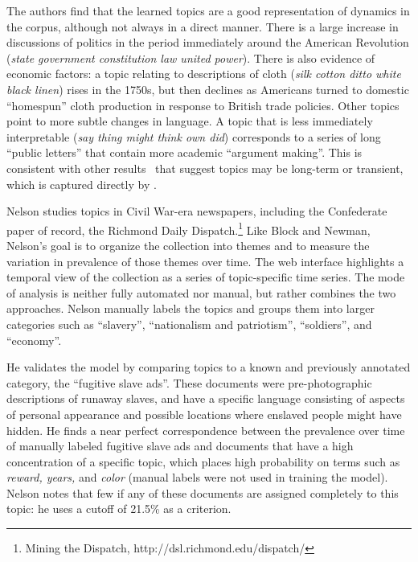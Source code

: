 The authors find that the learned topics are a good representation of dynamics in the corpus, although not always in a direct manner.
There is a large increase in discussions of politics in the period immediately around the American Revolution ({\em state government constitution law united power}).
There is also evidence of economic factors: a topic relating to descriptions of cloth ({\em silk cotton ditto white black linen}) rises in the 1750s, but then declines as Americans turned to domestic ``homespun'' cloth production in response to British trade policies.
Other topics point to more subtle changes in language.
A topic that is less immediately interpretable ({\em  say thing might think own did}) corresponds to a series of long ``public letters'' that contain more academic ``argument making''.  This is consistent with other results~\citep{viermetz-08} that suggest topics may be long-term or transient, which is captured directly by \citet{viermetz-08}.


Nelson studies topics in Civil War-era newspapers, including the Confederate paper of record, the Richmond Daily Dispatch.\footnote{Mining the Dispatch, http://dsl.richmond.edu/dispatch/}
Like Block and Newman, Nelson's goal is to organize the collection into themes and to measure the variation in prevalence of those themes over time.
The web interface highlights a temporal view of the collection as a series of topic-specific time series.
The mode of analysis is neither fully automated nor manual, but rather combines the two approaches.
Nelson manually labels the topics and groups them into larger categories such as ``slavery'', ``nationalism and patriotism'', ``soldiers'', and ``economy''.

He validates the model by comparing topics to a known and previously annotated category, the ``fugitive slave ads''.
These documents were pre-photographic descriptions of runaway slaves, and have a specific language consisting of aspects of personal appearance and possible locations where enslaved people might have  hidden.
He finds a near perfect correspondence between the prevalence over time of manually labeled fugitive slave ads and documents that have a high concentration of a specific topic, which places high probability on terms such as {\em reward, years,} and {\em color} (manual labels were not used  in training the model).
Nelson notes that few if any of these documents are assigned completely to this topic: he uses a cutoff of 21.5\% as a criterion.

